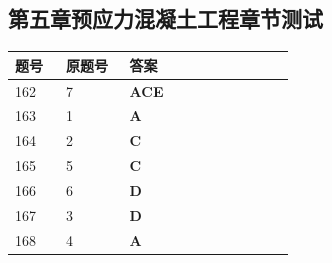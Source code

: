 \documentclass[UTF8,fontset=windows,11pt]{ctexart}
\begin{document}
\vspace{0.4em}
\subsection*{第五章预应力混凝土工程章节测试}
\begin{longtable}{p{0.16\linewidth}p{0.2\linewidth}p{0.52\linewidth}}
\textbf{\textcolor{examnavy}{题号}} & \textbf{\textcolor{examnavy}{原题号}} & \textbf{\textcolor{answergreen}{答案}} \\
\hline
162 & 7 & \textbf{\textcolor{answergreen}{ACE}} \\
163 & 1 & \textbf{\textcolor{answergreen}{A}} \\
164 & 2 & \textbf{\textcolor{answergreen}{C}} \\
165 & 5 & \textbf{\textcolor{answergreen}{C}} \\
166 & 6 & \textbf{\textcolor{answergreen}{D}} \\
167 & 3 & \textbf{\textcolor{answergreen}{D}} \\
168 & 4 & \textbf{\textcolor{answergreen}{A}} \\
\end{longtable}
\vspace{0.4em}
\end{document}
